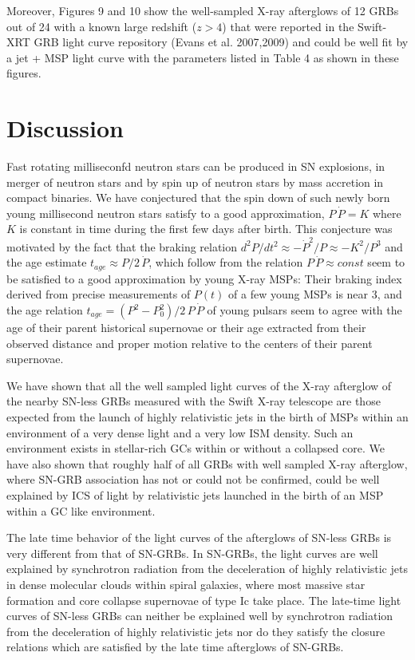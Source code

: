 \documentclass[twocolumn]{aastex61}
\begin{document}
Moreover, Figures 9 and 10 show the well-sampled 
X-ray afterglows of 12 GRBs out of 24 with a known large redshift ($z>4$) that 
were reported in the Swift-XRT GRB light curve repository (Evans et al. 
2007,2009) and could be well fit by a jet + MSP light curve
with the parameters listed in Table 4 as shown in these figures. 


\section{Discussion}

Fast rotating milliseconfd neutron stars can be produced in SN explosions, 
in merger of neutron stars and by spin up of neutron stars by mass 
accretion in compact binaries. We have conjectured that the 
spin down of such newly born young millisecond neutron stars  satisfy 
to a good approximation, $P\,\dot{P}=K$ where $K$ is constant in time 
during the first few days after birth.
This conjecture was motivated by the fact that 
the braking relation $d^2P/dt^2\approx -\dot{P}^2/P\approx -K^2/P^3$ 
and the age estimate $t_{age}\approx P/2\,\dot{P}$, which follow from the 
relation $P\,\dot{P}\approx const$ seem to be satisfied to a good 
approximation by young X-ray MSPs: Their braking index derived from 
precise measurements of $P(t)$ of a few young MSPs is near 3, and the 
age relation $t_{age}=(P^2-P_0^2)/2\,P\, \dot{P}$ of young pulsars seem 
to agree with the age of their parent historical supernovae or their 
age extracted from their observed distance and proper motion relative 
to the centers of their parent supernovae.

We have shown that all the well sampled light curves of the  X-ray 
afterglow of the nearby SN-less GRBs measured with the Swift X-ray 
telescope are those expected from the launch of highly  relativistic jets  in 
the birth of MSPs within an environment of a very dense light and a very 
low ISM density. Such an environment exists in stellar-rich GCs within or 
without a collapsed core.  We have also shown that roughly half of all 
GRBs with well sampled X-ray afterglow, where  SN-GRB 
association has not or could not be confirmed, could be well 
explained by ICS of light by relativistic jets launched in the birth of an 
MSP within a GC like environment.

The late time behavior of the light curves of the afterglows of SN-less 
GRBs is very different from that of SN-GRBs. In SN-GRBs, the light curves 
are well explained by synchrotron radiation from the deceleration of 
highly relativistic jets in dense molecular clouds within spiral galaxies, 
where most massive star formation and core collapse supernovae of type Ic 
take place.  The late-time light curves of SN-less GRBs can neither be 
explained well by synchrotron radiation from the deceleration of highly 
relativistic jets nor do they satisfy the closure relations which are 
satisfied by the late time afterglows of SN-GRBs.
 
\end{document}

